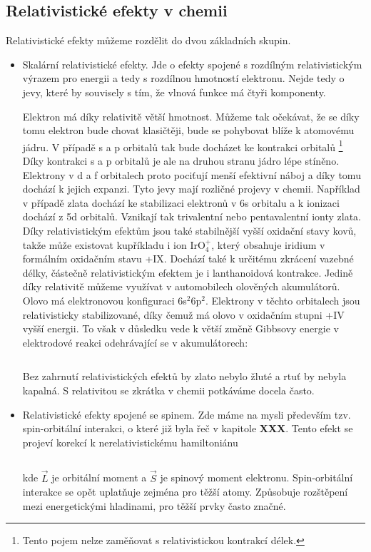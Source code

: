   

\subsection{Relativistické efekty v chemii}

Relativistické efekty můžeme rozdělit do dvou základních skupin. 

\begin{itemize} 

\item Skalární relativistické efekty. Jde o efekty spojené s rozdílným relativistickým výrazem pro energii a tedy s rozdílnou hmotností elektronu. Nejde tedy o jevy, které by souvisely s tím, že vlnová funkce má čtyři komponenty. 

Elektron má díky relativitě větší hmotnost. Můžeme tak očekávat, že se díky tomu elektron bude chovat klasičtěji, bude se pohybovat blíže k atomovému jádru. V případě s a p orbitalů tak bude docházet ke kontrakci orbitalů  \footnote{Tento pojem nelze zaměňovat s relativistickou kontrakcí délek.} Díky kontrakci s a p orbitalů je ale na druhou stranu jádro lépe stíněno. Elektrony v d a f orbitalech proto pociťují menší efektivní náboj a díky tomu dochází k jejich expanzi. Tyto jevy mají rozličné projevy v chemii. Například v případě zlata dochází ke stabilizaci elektronů v 6s orbitalu a k ionizaci dochází z 5d orbitalů. Vznikají tak trivalentní nebo pentavalentní ionty zlata. Díky relativistickým efektům jsou také stabilnější vyšší oxidační stavy kovů, takže může existovat kupříkladu i ion IrO$_4^+$, který obsahuje iridium v formálním oxidačním stavu +IX. Dochází také k určitému zkrácení vazebné délky, částečně relativistickým efektem je i lanthanoidová kontrakce. Jedině díky relativitě můžeme využívat v automobilech olověných akumulátorů. Olovo má elektronovou konfiguraci 6s$^2$6p$^2$. Elektrony v těchto orbitalech jsou relativisticky stabilizované, díky čemuž má olovo v oxidačním stupni +IV vyšší energii. To však v důsledku vede k větší změně Gibbsovy energie v elektrodové reakci odehrávající se v akumulátorech:  

\begin{equation}
\label{rov:XXX}
\end{equation}

Bez zahrnutí relativistických efektů by zlato nebylo žluté a rtuť by nebyla kapalná. S relativitou se zkrátka v chemii potkáváme docela často. 

\item Relativistické efekty spojené se spinem. Zde máme na mysli především tzv. spin-orbitální interakci, o které již byla řeč v kapitole \textbf{XXX}. Tento efekt se projeví korekcí k nerelativistickému hamiltoniánu

\begin{equation}
\label{rov:XXX}
\end{equation}

\noindent
kde $\vec{L}$ je orbitální moment a $\vec{S}$ je spinový moment elektronu. Spin-orbitální interakce se opět uplatňuje zejména pro těžší atomy. Způsobuje rozštěpení mezi energetickými hladinami, pro těžší prvky často značné.

\end{itemize}

